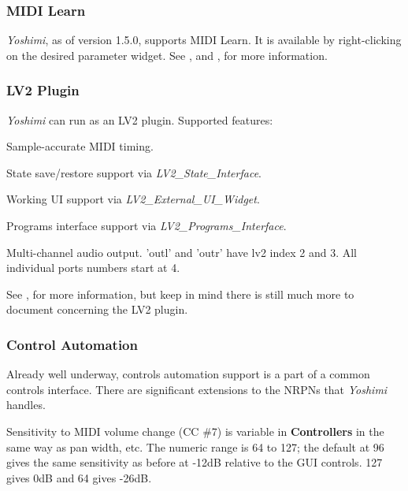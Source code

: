 \documentclass[
 11pt,
 twoside,
 a4paper,
 final                                 %
]{article}
\begin{document}
\subsubsection{MIDI Learn}
\label{subsubsec:new_features_midi_learn}

   \textsl{Yoshimi}, as of version 1.5.0, supports MIDI Learn.
   It is available by right-clicking on the desired parameter widget.
   See ,
   and , for more information.

\subsubsection{LV2 Plugin}
\label{subsubsec:new_features_lv2_plugin}

   \textsl{Yoshimi} can run as an LV2 plugin.  Supported features:

   \begin{enumber}
      \item Sample-accurate MIDI timing.
      \item State save/restore support via \textsl{LV2\_State\_Interface}.
      \item Working UI support via \textsl{LV2\_External\_UI\_Widget}.
      \item Programs interface support via \textsl{LV2\_Programs\_Interface}.
      \item Multi-channel audio output.
         'outl' and 'outr' have lv2 index 2 and 3.
         All individual ports numbers start at 4.
   \end{enumber}

   See , for more information, but keep in
   mind there is still much more to document concerning the LV2 plugin.

\subsubsection{Control Automation}
\label{subsubsec:new_features_control_automation}

   Already well underway, controls automation support is a part of a common
   controls interface.  There are significant extensions to the NRPNs that
   \textsl{Yoshimi} handles.  

   Sensitivity to MIDI volume change (CC \#7) is variable in
   \textbf{Controllers} in the same way as pan width, etc. The numeric range is
   64 to 127; the default at 96 gives the same sensitivity as before at -12dB
   relative to the GUI controls.  127 gives 0dB and 64 gives -26dB.
\end{document}
